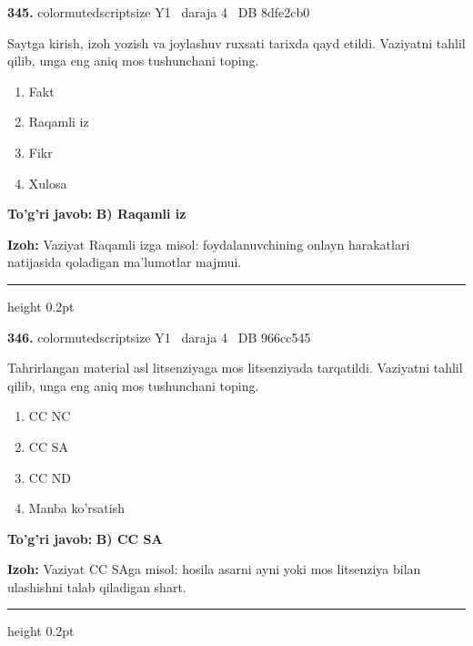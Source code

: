\documentclass[10pt,a4paper,oneside]{article}
\begin{document}
\noindent\textbf{\color{ink}345.}  {color{muted}scriptsize Y1 \textbullet\ daraja 4 \textbullet\ DB 8dfe2cb0}
\par
Saytga kirish, izoh yozish va joylashuv ruxsati tarixda qayd etildi. Vaziyatni tahlil qilib, unga eng aniq mos tushunchani toping.
\begin{enumerate}[label=\Alph*),leftmargin=9mm]
\item Fakt
\item Raqamli iz
\item Fikr
\item Xulosa
\end{enumerate}
\begin{tcolorbox}[enhanced,breakable,colback=teal!4,colframe=teal!50!black,boxrule=0.5pt,arc=1.1mm,left=3mm,right=3mm,top=1.7mm,bottom=1.7mm,before skip=2mm,after skip=2mm]
\textbf{\color{teal}To'g'ri javob:} \textbf{B) Raqamli iz}
\par\smallskip
\textbf{Izoh:} Vaziyat Raqamli izga misol: foydalanuvchining onlayn harakatlari natijasida qoladigan ma'lumotlar majmui.
\end{tcolorbox}
\vspace{2mm}\hrule height 0.2pt \vspace{3mm}

\noindent\textbf{\color{ink}346.}  {color{muted}scriptsize Y1 \textbullet\ daraja 4 \textbullet\ DB 966cc545}
\par
Tahrirlangan material asl litsenziyaga mos litsenziyada tarqatildi. Vaziyatni tahlil qilib, unga eng aniq mos tushunchani toping.
\begin{enumerate}[label=\Alph*),leftmargin=9mm]
\item CC NC
\item CC SA
\item CC ND
\item Manba ko'rsatish
\end{enumerate}
\begin{tcolorbox}[enhanced,breakable,colback=teal!4,colframe=teal!50!black,boxrule=0.5pt,arc=1.1mm,left=3mm,right=3mm,top=1.7mm,bottom=1.7mm,before skip=2mm,after skip=2mm]
\textbf{\color{teal}To'g'ri javob:} \textbf{B) CC SA}
\par\smallskip
\textbf{Izoh:} Vaziyat CC SAga misol: hosila asarni ayni yoki mos litsenziya bilan ulashishni talab qiladigan shart.
\end{tcolorbox}
\vspace{2mm}\hrule height 0.2pt \vspace{3mm}
\end{document}
